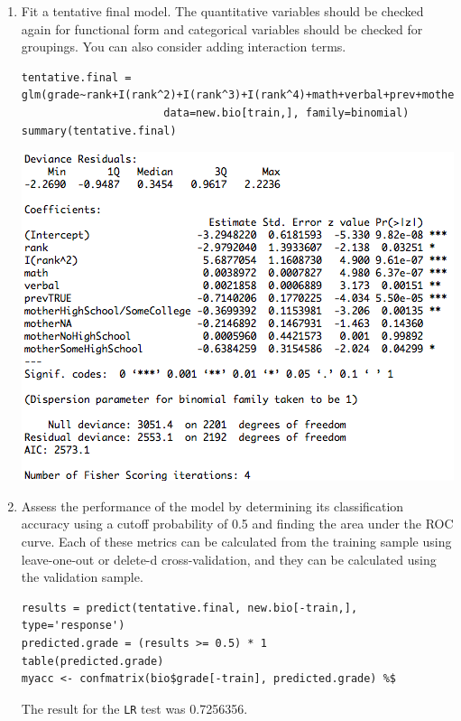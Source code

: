 \documentclass[11pt]{article}
\begin{document}
\begin{enumerate}
\begin{enumerate}
	\item Fit a tentative final model. The quantitative variables should be checked again
          for functional form and categorical variables should be checked for groupings. 
          You can also consider adding interaction terms. 

\begin{Verbatim}
tentative.final = glm(grade~rank+I(rank^2)+I(rank^3)+I(rank^4)+math+verbal+prev+mother, 
                      data=new.bio[train,], family=binomial)
summary(tentative.final)
\end{Verbatim}
		\begin{center}
			\includegraphics[scale=0.7]{tentative_summary}
		\end{center}

	\item Assess the performance of the model by determining its classification accuracy 
         using a cutoff probability of 0.5 and finding the area under the ROC curve. 
         Each of these metrics can be calculated from the training sample using 
         leave-one-out or delete-d cross-validation, and they can be calculated using 
         the validation sample. 

\begin{Verbatim}
results = predict(tentative.final, new.bio[-train,], type='response')
predicted.grade = (results >= 0.5) * 1
table(predicted.grade)
myacc <- confmatrix(bio$grade[-train], predicted.grade) %$
\end{Verbatim}
	The result for the \verb|LR| test was 0.7256356.



\end{enumerate}
\end{enumerate}
\end{document}
